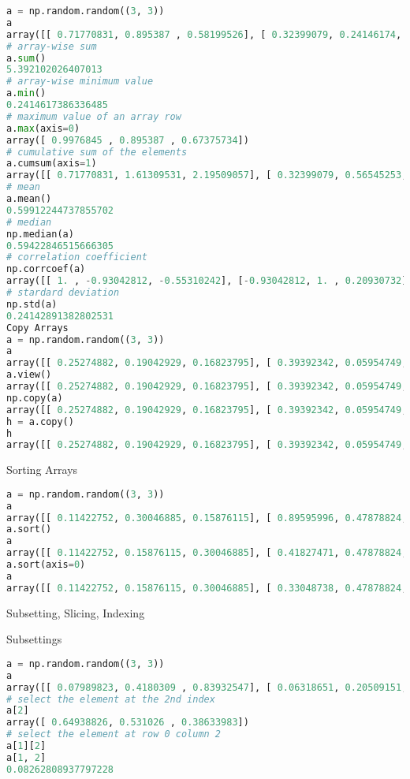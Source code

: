 \begin{lstlisting}[language=Python]
a = np.random.random((3, 3))
a
array([[ 0.71770831, 0.895387 , 0.58199526], [ 0.32399079, 0.24146174, 0.59422847], [ 0.9976845 , 0.36588863, 0.67375734]])
# array-wise sum
a.sum()
5.392102026407013
# array-wise minimum value
a.min()
0.2414617386336485
# maximum value of an array row
a.max(axis=0)
array([ 0.9976845 , 0.895387 , 0.67375734])
# cumulative sum of the elements
a.cumsum(axis=1)
array([[ 0.71770831, 1.61309531, 2.19509057], [ 0.32399079, 0.56545253, 1.15968099], [ 0.9976845 , 1.36357313, 2.03733047]])
# mean
a.mean()
0.59912244737855702
# median
np.median(a)
0.59422846515666305
# correlation coefficient
np.corrcoef(a)
array([[ 1. , -0.93042812, -0.55310242], [-0.93042812, 1. , 0.20930732], [-0.55310242, 0.20930732, 1. ]])
# stardard deviation
np.std(a)
0.24142891382802531
Copy Arrays
a = np.random.random((3, 3))
a
array([[ 0.25274882, 0.19042929, 0.16823795], [ 0.39392342, 0.05954749, 0.8608243 ], [ 0.99375507, 0.92845989, 0.45681322]])
a.view()
array([[ 0.25274882, 0.19042929, 0.16823795], [ 0.39392342, 0.05954749, 0.8608243 ], [ 0.99375507, 0.92845989, 0.45681322]])
np.copy(a)
array([[ 0.25274882, 0.19042929, 0.16823795], [ 0.39392342, 0.05954749, 0.8608243 ], [ 0.99375507, 0.92845989, 0.45681322]])
h = a.copy()
h
array([[ 0.25274882, 0.19042929, 0.16823795], [ 0.39392342, 0.05954749, 0.8608243 ], [ 0.99375507, 0.92845989, 0.45681322]])
\end{lstlisting}

Sorting Arrays

\begin{lstlisting}[language=Python]
a = np.random.random((3, 3))
a
array([[ 0.11422752, 0.30046885, 0.15876115], [ 0.89595996, 0.47878824, 0.41827471], [ 0.69593773, 0.52119338, 0.33048738]])
a.sort()
a
array([[ 0.11422752, 0.15876115, 0.30046885], [ 0.41827471, 0.47878824, 0.89595996], [ 0.33048738, 0.52119338, 0.69593773]])
a.sort(axis=0)
a
array([[ 0.11422752, 0.15876115, 0.30046885], [ 0.33048738, 0.47878824, 0.69593773], [ 0.41827471, 0.52119338, 0.89595996]])
\end{lstlisting}

Subsetting, Slicing, Indexing

Subsettings

\begin{lstlisting}[language=Python]
a = np.random.random((3, 3))
a
array([[ 0.07989823, 0.4180309 , 0.83932547], [ 0.06318651, 0.20509151, 0.08262809], [ 0.64938826, 0.531026 , 0.38633983]])
# select the element at the 2nd index
a[2]
array([ 0.64938826, 0.531026 , 0.38633983])
# select the element at row 0 column 2
a[1][2]
a[1, 2]
0.08262808937797228
\end{lstlisting}

